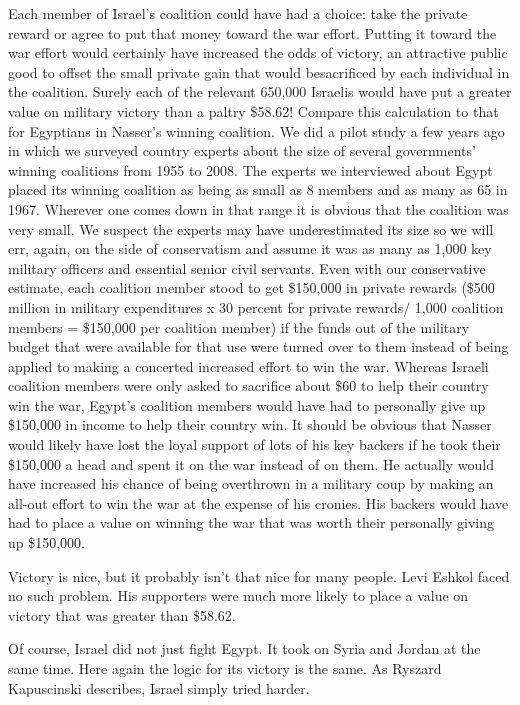 \documentclass[10pt]{article}
\begin{document}
{\large Each member of Israel's coalition could have had a choice: take the
private reward or agree to put that money toward the war effort. Putting it
toward the war effort would certainly have increased the odds of victory, an
attractive public good to offset the small private gain that would besacrificed
by each individual in the coalition. Surely each of the relevant 650,000 Israelis
would have put a greater value on military victory than a paltry \$58.62! Compare
this calculation to that for Egyptians in Nasser's winning coalition. We did a
pilot study a few years ago in which we surveyed country experts about the size
of several governments' winning coalitions from 1955 to 2008. The experts we
interviewed about Egypt placed its winning coalition as being as small as 8
members and as many as 65 in 1967. Wherever one comes down in that range it is
obvious that the coalition was very small. We suspect the experts may have
underestimated its size so we will err, again, on the side of conservatism and
assume it was as many as 1,000 key military officers and essential senior civil
servants. Even with our conservative estimate, each coalition member stood to get
\$150,000 in private rewards (\$500 million in military expenditures x 30 percent
for private rewards/ 1,000 coalition members = \$150,000 per coalition member) if
the funds out of the military budget that were available for that use were turned
over to them instead of being applied to making a concerted increased effort to
win the war. Whereas Israeli coalition members were only asked to sacrifice about
\$60 to help their country win the war, Egypt's coalition members would have had
to personally give up \$150,000 in income to help their country win. It should be
obvious that Nasser would likely have lost the loyal support of lots of his key
backers if he took their \$150,000 a head and spent it on the war instead of on
them. He actually would have increased his chance of being overthrown in a
military coup by making an all-out effort to win the war at the expense of his
cronies. His backers would have had to place a value on winning the war that was
worth their personally giving up \$150,000.}

{\large Victory is nice, but it probably isn't that nice for many people. Levi
Eshkol faced no such problem. His supporters were much more likely to place a
value on victory that was greater than \$58.62.}

{\large Of course, Israel did not just fight Egypt. It took on Syria and Jordan
at the same time. Here again the logic for its victory is the same. As Ryszard
Kapuscinski describes, Israel simply tried harder.}
\end{document}
